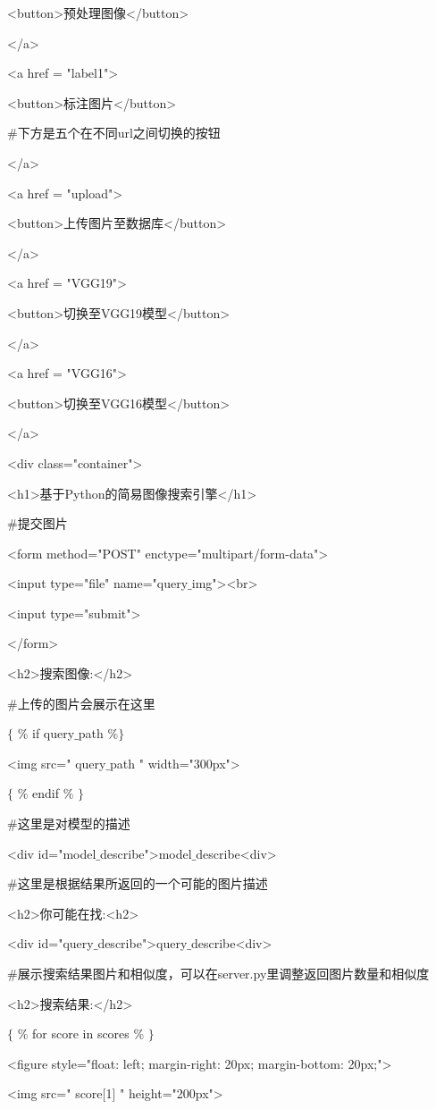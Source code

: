 \documentclass[bachelor_p]{hdu-thesis}
\begin{document}
<button>预处理图像</button>

</a>

<a href = "label1">

<button>标注图片</button>

$\#$下方是五个在不同url之间切换的按钮

</a>

<a href = "upload">

<button>上传图片至数据库</button>

</a>

<a href = "VGG19">

<button>切换至VGG19模型</button>

</a>

<a href = "VGG16">

<button>切换至VGG16模型</button>

</a>

<div class="container">

<h1>基于Python的简易图像搜索引擎</h1>

$\#$提交图片

<form method="POST" enctype="multipart/form-data">

<input type="file" name="query$\_$img"><br>

<input type="submit">

</form>

<h2>搜索图像:</h2>

$\#$上传的图片会展示在这里

$\{$ $\%$ if query$\_$path $\%$$\}$

<img src="{{ query$\_$path }}" width="300px">

$\{$ $\%$ endif $\%$ $\}$

$\#$这里是对模型的描述

<div id="model$\_$describe">{{model$\_$describe}}<div>

$\#$这里是根据结果所返回的一个可能的图片描述

<h2>你可能在找:<h2>

<div id="query$\_$describe">{{query$\_$describe}}<div>

$\#$展示搜索结果图片和相似度，可以在server.py里调整返回图片数量和相似度

<h2>搜索结果:</h2>

$\{$ $\%$ for score in scores $\%$ $\}$

<figure style="float: left; margin-right: 20px; margin-bottom: 20px;">

<img src="{{ score[1] }}" height="200px">
\end{document}
